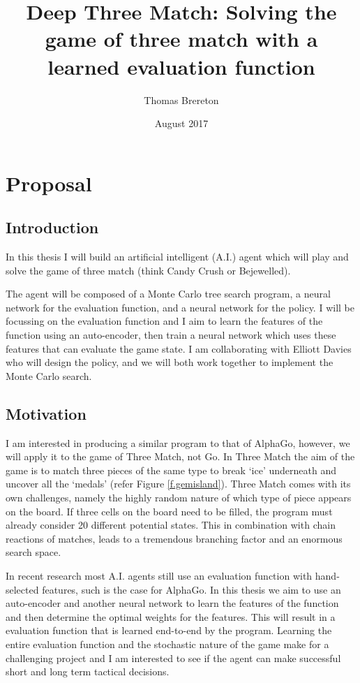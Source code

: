 \documentclass{bhamthesis}
\title{Deep Three Match: Solving the game of three match with a learned evaluation function}
\author{Thomas Brereton}
\date{August 2017}  %
\makeatletter
\theoremstyle{definition}
\newcommand{\makecrestcover}{%
\begin{titlepage}
\centering\singlespacing
\vspace*{1cm}
{\huge\bfseries University of Birmingham\par}
\vspace*{2cm}
\texttt{[image: media/img/crest]}\par
\vspace*{\stretch{1}}
{\Huge\bfseries
\@author\par
\vspace{1cm}
\@title\par}
\vspace*{\stretch{1}}
{\Large\@date\par}
\end{titlepage}
}
\makeatother
\begin{document}
\frontmatter

\maketitle



\mainmatter
\chapter{Proposal}
\section{Introduction}
In this thesis I will build an artificial intelligent (A.I.) agent which will play and solve the game of three match (think Candy Crush or Bejewelled).

The agent will be composed of a Monte Carlo tree search program, a neural network for the evaluation function, and a neural network for the policy. I will be focussing on the evaluation function and I aim to learn the features of the function using an auto-encoder, then train a neural network which uses these features that can evaluate the game state. I am collaborating with Elliott Davies who will design the policy, and we will both work together to implement the Monte Carlo search.

\section{Motivation}
I am interested in producing a similar program to that of AlphaGo, however, we will apply it to the game of Three Match, not Go. In Three Match the aim of the game is to match three pieces of the same type to break `ice' underneath and uncover all the `medals' (refer Figure \ref{f.gemisland}). Three Match comes with its own challenges, namely the highly random nature of which type of piece appears on the board. If three cells on the board need to be filled, the program must already consider 20 different potential states. This in combination with chain reactions of matches, leads to a tremendous branching factor and an enormous search space. 

In recent research most A.I. agents still use an evaluation function with hand-selected features, such is the case for AlphaGo. In this thesis we aim to use an auto-encoder and another neural network to learn the features of the function and then determine the optimal weights for the features. This will result in a evaluation function that is learned end-to-end by the program. Learning the entire evaluation function and the stochastic nature of the game make for a challenging project and I am interested to see if the agent can make successful short and long term tactical decisions.
\end{document}

